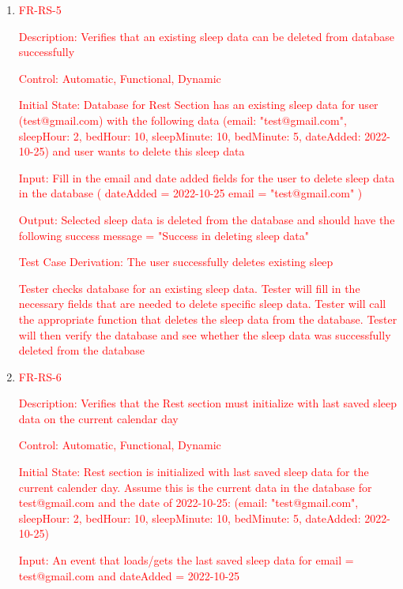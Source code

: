 \documentclass[12pt, titlepage]{article}
\begin{document}
\begin{enumerate}
  \item{\textcolor{red}{FR-RS-5\\}}

 \textcolor{red}{Description: Verifies that an existing sleep data can be deleted from database successfully}
	
	\textcolor{red}{Control: Automatic, Functional, Dynamic}
	
	\textcolor{red}{Initial State: Database for Rest Section has an existing sleep data for user (test@gmail.com) with the following data (email: "test@gmail.com", sleepHour: 2, bedHour: 10, sleepMinute: 10, bedMinute: 5, dateAdded: 2022-10-25) and user wants to delete this sleep data}
	
	\textcolor{red}{Input: Fill in the email and date added fields for the user to delete sleep data in the database ( dateAdded = 2022-10-25 email = "test@gmail.com" )}
	
	\textcolor{red}{Output: Selected sleep data is deleted from the database and should have the following success message = "Success in deleting sleep data"}
	
	\textcolor{red}{Test Case Derivation: The user successfully deletes existing sleep}
	
	\textcolor{red}{Tester checks database for an existing sleep data. Tester will fill in the necessary fields that are needed to delete specific sleep data. Tester will call the appropriate function that deletes the sleep data from the database. Tester will then verify the database and see whether the sleep data was successfully deleted from the database}

   \item{\textcolor{red}{FR-RS-6\\}}

 \textcolor{red}{Description: Verifies that the Rest section must initialize with last saved sleep data on the current calendar day}
	
	\textcolor{red}{Control: Automatic, Functional, Dynamic}
	
	\textcolor{red}{Initial State: Rest section is initialized with last saved sleep data for the current calender day. Assume this is the current data in the database for test@gmail.com and the date of 2022-10-25: (email: "test@gmail.com", sleepHour: 2, bedHour: 10, sleepMinute: 10, bedMinute: 5, dateAdded: 2022-10-25)}
	
	\textcolor{red}{Input: An event that loads/gets the last saved sleep data for email = test@gmail.com and dateAdded = 2022-10-25}
	

\end{enumerate}
\end{document}
